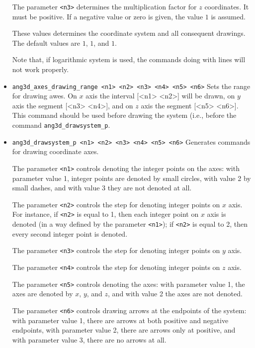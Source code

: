 \documentclass[a4paper]{book}
\begin{document}
\begin{itemize}
        The parameter \verb|<n3>| determines the multiplication factor for $z$ coordinates. It
        must be  positive. If a negative value or zero is given, the value $1$ is assumed.

        These values determines the coordinate system and all consequent drawings.
        The default values are $1$, $1$, and $1$.

        Note that, if logarithmic system is used, the commands doing with lines will not
        work properly.

\item
\verb|ang3d_axes_drawing_range <n1> <n2> <n3> <n4> <n5> <n6>|
        Sets the range for drawing awes. On $x$ axis the interval [<n1> <n2>]
        will be drawn, on $y$ axis the segment [<n3> <n4>], and on $z$ axis
        the segment [<n5> <n6>]. This command should be used before drawing the system
        (i.e., before the command \verb|ang3d_drawsystem_p|.

\item
\verb|ang3d_drawsystem_p <n1> <n2> <n3> <n4> <n5> <n6>|
        Generates commands for drawing coordinate axes.

        The parameter \verb|<n1>| controls denoting the integer points on the axes:
        with parameter value 1, integer points are denoted by small circles,
        with value 2 by small dashes, and with value 3 they are not denoted at all.

        The parameter \verb|<n2>| controls the step for denoting integer points
        on $x$ axis. For instance, if \verb|<n2>| is equal to 1, then each integer
        point on $x$ axis is denoted (in a way defined by the parameter \verb|<n1>|);
        if \verb|<n2>| is equal to 2, then every second integer point is denoted.

        The parameter \verb|<n3>| controls the step for denoting integer points
        on $y$ axis.

        The parameter \verb|<n4>| controls the step for denoting integer points
        on $z$ axis.

        The parameter \verb|<n5>| controls denoting the axes:
        with parameter value 1, the axes are denoted by $x$, $y$, and $z$,
        and with value 2 the axes are not denoted.

        The parameter \verb|<n6>| controls drawing arrows at the endpoints of the system:
        with parameter value 1, there are arrows at both positive and negative endpoints,
        with parameter value 2, there are arrows only at positive,
        and with parameter value 3, there are no arrows at all.



\end{itemize}
\end{document}
